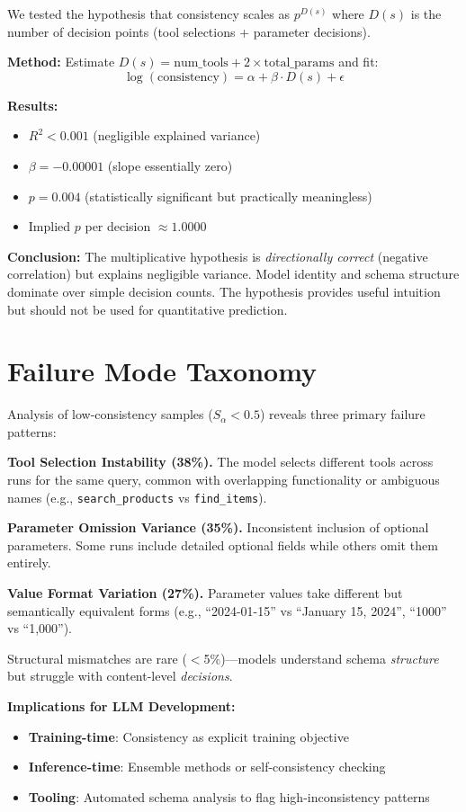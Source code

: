 \documentclass[sigconf,anonymous,review]{acmart}
\begin{document}
We tested the hypothesis that consistency scales as $p^{D(s)}$ where $D(s)$ is the number of decision points (tool selections + parameter decisions).

\textbf{Method:} Estimate $D(s) = \text{num\_tools} + 2 \times \text{total\_params}$ and fit:
\begin{equation}
\log(\text{consistency}) = \alpha + \beta \cdot D(s) + \epsilon
\end{equation}

\textbf{Results:}
\begin{itemize}
    \item $R^2 < 0.001$ (negligible explained variance)
    \item $\beta = -0.00001$ (slope essentially zero)
    \item $p = 0.004$ (statistically significant but practically meaningless)
    \item Implied $p$ per decision $\approx 1.0000$
\end{itemize}

\textbf{Conclusion:} The multiplicative hypothesis is \textit{directionally correct} (negative correlation) but explains negligible variance. Model identity and schema structure dominate over simple decision counts. The hypothesis provides useful intuition but should not be used for quantitative prediction.

\section{Failure Mode Taxonomy}
\label{app:failure_modes}

Analysis of low-consistency samples ($S_\alpha < 0.5$) reveals three primary failure patterns:

\textbf{Tool Selection Instability (38\%).} The model selects different tools across runs for the same query, common with overlapping functionality or ambiguous names (e.g., \texttt{search\_products} vs \texttt{find\_items}).

\textbf{Parameter Omission Variance (35\%).} Inconsistent inclusion of optional parameters. Some runs include detailed optional fields while others omit them entirely.

\textbf{Value Format Variation (27\%).} Parameter values take different but semantically equivalent forms (e.g., ``2024-01-15'' vs ``January 15, 2024'', ``1000'' vs ``1,000'').

Structural mismatches are rare ($<$5\%)---models understand schema \textit{structure} but struggle with content-level \textit{decisions}.

\textbf{Implications for LLM Development:}
\begin{itemize}
    \item \textbf{Training-time}: Consistency as explicit training objective
    \item \textbf{Inference-time}: Ensemble methods or self-consistency checking
    \item \textbf{Tooling}: Automated schema analysis to flag high-inconsistency patterns
\end{itemize}
\end{document}
